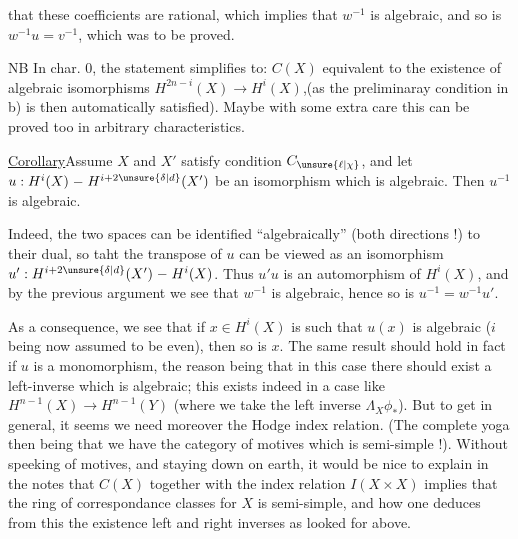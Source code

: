 
that these coefficients are rational, which implies that $w^{-1}$ is algebraic, and so is $w^{-1}u=v^{-1}$, which was to be proved.

NB In char. 0,  the statement simplifies to: $C(X)$ equivalent to the existence of algebraic isomorphisms $H^{2n-i}(X)\to H^i(X)$,(as the preliminaray condition in b) is then automatically satisfied). Maybe with some extra care this can be proved too in arbitrary characteristics.

\uline{Corollary}\quad Assume $X$ and $X'$ satisfy condition $C_{\unsure{\ell|\chi}}$, and let $u:H^i(X)\mathrel{-}H^{i+2\unsure{\delta|d}}(X')$  be an isomorphism which is algebraic. Then $u^{-1}$ is algebraic.

Indeed, the two spaces can be identified ``algebraically'' (both directions !) to their dual, so taht the transpose of $u$ can be viewed as an isomorphism $u':H^{i+2\unsure{\delta|d}}(X')\mathrel{-}H^i(X)$. Thus $u'u$ is an  automorphism  of $H^i(X)$, and by the previous argument we see that $w^{-1}$ is algebraic, hence so is $u^{-1}=w^{-1}u'$.

As a consequence, we see that if $x\in H^i(X)$ is such that $u(x)$ is algebraic ($i$ being now assumed to be even), then so is $x$. The same result should hold in fact if $u$ is a monomorphism, the reason being that in this case there should exist a left-inverse which is algebraic; this exists indeed in a case like $H^{n-1}(X)\to H^{n-1}(Y)$ (where we take the left inverse $\Lambda_X\phi_*$). But to get  in general, it seems we need moreover the Hodge index relation. (The complete yoga then being that we have the category of motives which is semi-simple !). Without speeking of motives, and staying down on earth, it would be nice to explain in the notes that $C(X)$ together with the index relation $I(X\times X)$ implies that the ring of correspondance classes for $X$ is semi-simple, and how one deduces from this the existence  left and right inverses as looked for above.

